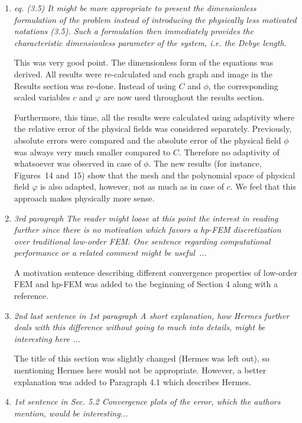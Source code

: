 \documentclass[mathpazo]{cicp}
\begin{document}
\begin{enumerate}
\item \emph{eq. (3.5) It might be more appropriate to present the dimensionless formulation of the problem instead of introducing the physically less motivated notations (3.5). Such a formulation then
immediately provides the characteristic dimensionless parameter of the system, i.e. the Debye
length.}

This was very good point. The dimensionless form of the equations was derived. All
results were re-calculated and each graph and image in the Results section was re-done.
Instead of using $C$
and $\phi$, the corresponding scaled variables $c$ and $\varphi$ are now used throughout the results section.

Furthermore, this time, all the results were calculated using adaptivity where the relative error
of the physical fields was considered separately.  Previously, absolute errors were compared
and the absolute error of the physical field $\phi$ was always very  much smaller compared to
$C$. Therefore no adaptivity of whatsoever was observed in case of $\phi$. The new results
(for instance, Figures~14 and~15) show that the mesh and the polynomial
space of physical field $\varphi$ is also adapted, however, not as much as in case of $c$.
We feel that this approach makes physically more sense.

\item \emph{3rd paragraph The reader might loose at this point the interest in reading further since there
is no motivation which favors a hp-FEM discretization over traditional low-order FEM. One
sentence regarding computational performance or a related comment might be useful~...}

A motivation sentence describing different convergence properties of low-order FEM 
and hp-FEM was added to the beginning of Section 4 along with a reference. 

\item \emph{2nd last sentence in 1st paragraph A short explanation, how Hermes further deals with this
difference without going to much into details, might be interesting here ...}

The title of this section was slightly changed (Hermes was left out), so mentioning Hermes here would not be 
appropriate. However, a better explanation was added to Paragraph 4.1 which describes Hermes. 

\item \emph{1st sentence in Sec. 5.2 Convergence plots of the error, which the authors mention, would be interesting...}


\end{enumerate}
\end{document}
